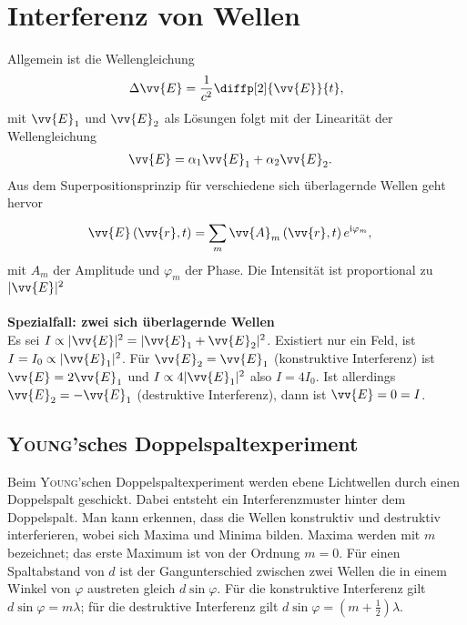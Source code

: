 \documentclass[a4paper,12pt]{article}
\numberwithin{equation}{section}
\begin{document}
\section{Interferenz von Wellen}
Allgemein ist die Wellengleichung
\begin{align} 
        \Delta \vv{E}=\dfrac{1}{c^2}\diffp[2]{\vv{E}}{t}
,\end{align} 
mit $\vv{E}_1$ und $\vv{E}_2$ als Lösungen folgt mit der Linearität der Wellengleichung
\begin{align} 
        \vv{E}&=\alpha _1\vv{E}_1+\alpha _2\vv{E}_2
.\end{align} 
Aus dem Superpositionsprinzip für verschiedene sich überlagernde Wellen geht hervor
\begin{align} 
        \vv{E}\left(\vv{r},t\right)&=\sum_{m}^{}\vv{A}_m\left(\vv{r},t\right)e^{\text{i}\varphi _m}
,\end{align} 
mit $A_m$ der Amplitude und $\varphi _m$ der Phase. Die Intensität ist proportional zu $|\vv{E}|^2$ 
\\\hfill\\\textbf{Spezialfall: zwei sich überlagernde Wellen}\\
Es sei $I\propto |\vv{E}|^2=|\vv{E}_1+\vv{E}_2|^2$. 
Existiert nur ein Feld, ist $I=I_0\propto |\vv{E}_1|^2$. 
Für $\vv{E}_2=\vv{E}_1$ (konstruktive Interferenz) ist $\vv{E}=2\vv{E}_1$ und $I\propto 4|\vv{E}_1|^2$ also $I=4I_0$.
Ist allerdings $\vv{E}_2=-\vv{E}_1$ (destruktive Interferenz), dann ist $\vv{E}=0=I$.

\subsection{\textsc{Young}'sches Doppelspaltexperiment}
Beim \textsc{Young}'schen Doppelspaltexperiment werden ebene Lichtwellen durch einen Doppelspalt geschickt.
Dabei entsteht ein Interferenzmuster hinter dem Doppelspalt.
Man kann erkennen, dass die Wellen konstruktiv und destruktiv interferieren, wobei sich Maxima und Minima bilden.
Maxima werden mit $m$ bezeichnet; das erste Maximum ist von der Ordnung $m=0$.
Für einen Spaltabstand von $d$ ist der Gangunterschied zwischen zwei Wellen die in einem Winkel von $\varphi $ austreten gleich $d\sin \varphi $.
Für die konstruktive Interferenz gilt $d\sin \varphi =m\lambda $; für die destruktive Interferenz gilt $d\sin \varphi =\left(m+\tfrac{1}{2}\right)\lambda $.
\end{document}
